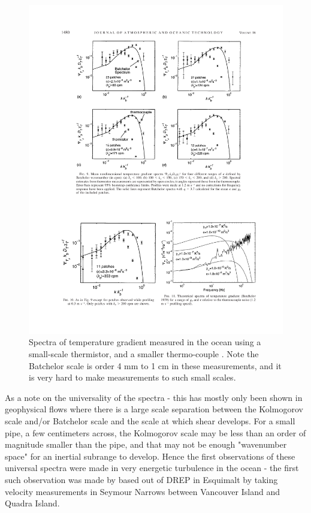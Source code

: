 \documentclass[11pt]{article}
\begin{document}
\begin{figure}[hbtp]
  \begin{center}
    \includegraphics[width=5in]{images/NashEtAl99Fig9}
    \caption{Spectra of temperature gradient measured in the ocean using a small-scale thermistor, and a smaller thermo-couple \citep{nashetal99}.  Note the Batchelor scale is order 4 mm to 1 cm in these measurements, and it is very hard to make measurements to such small scales.}   
    \label{fig:NashEtAl99Fig9}
  \end{center}
\end{figure}

As a note on the universality of the spectra - this has mostly only been shown in geophysical flows where there is a large scale separation between the Kolmogorov scale and/or Batchelor scale and the scale at which shear develops.  For a small pipe, a few centimeters across, the Kolmogorov scale may be less than an order of magnitude smaller than the pipe, and that may not be enough "wavenumber space" for an inertial subrange to develop.  Hence the first observations of these universal spectra were made in very energetic turbulence in the ocean - the first such observation was made by \citet{grantetal62} based out of DREP in Esquimalt by taking velocity measurements in Seymour Narrows between Vancouver Island and Quadra Island.  
\end{document}
